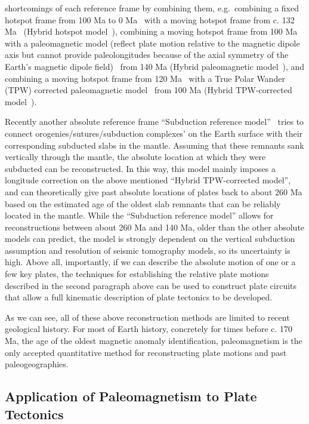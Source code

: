 shortcomings of each reference frame by combining them, e.g.\ combining a fixed
hotspot frame from 100 Ma to 0 Ma~\citep{M93} with a moving hotspot frame from
c. 132 Ma~\citep{O05} (Hybrid hotspot model~\citep{Sh12}),
combining a moving hotspot frame from 100 Ma~\citep{O05} with a
paleomagnetic model (reflect plate motion relative to the magnetic dipole axis
but cannot provide paleolongitudes because of the axial symmetry of the Earth's
magnetic dipole field)~\citep{T08} from 140 Ma (Hybrid
paleomagnetic model~\citep{Sh12}), and combining a moving hotspot frame from
120 Ma~\citep{O05} with a True Polar Wander (TPW) corrected
paleomagnetic model~\citep{S08} from 100 Ma (Hybrid TPW-corrected
model~\citep{Sh12}).

Recently another absolute reference frame ``Subduction reference
model''~\citep{v10} tries to connect orogenies/sutures/subduction complexes' on
the Earth surface with their corresponding subducted slabs in the mantle.
Assuming that these remnants sank vertically through the mantle, the absolute
location at which they were subducted can be reconstructed. In this way, this
model mainly imposes a longitude correction on the above mentioned ``Hybrid
TPW-corrected model'', and can theoretically give past absolute locations of
plates back to about 260 Ma based on the estimated age of the oldest slab
remnants that can be reliably located in the mantle. While the ``Subduction
reference model'' allows for reconstructions between about 260 Ma and 140 Ma,
older than the other absolute models can predict, the model is strongly
dependent on the vertical subduction assumption and resolution of seismic
tomography models, so its uncertainty is high. Above all, importantly, if we can
describe the absolute motion of one or a few key plates, the techniques for
establishing the relative plate motions described in the second paragraph above
can be used to construct plate circuits that allow a full kinematic description
of plate tectonics to be developed.

As we can see, all of these above reconstruction methods are limited to recent
geological history. For most of Earth history, concretely for times before c.
170 Ma, the age of the oldest magnetic anomaly identification, paleomagnetism
is the only accepted quantitative method for reconstructing plate motions and
past paleogeographies.

\subsection{Application of Paleomagnetism to Plate Tectonics}

